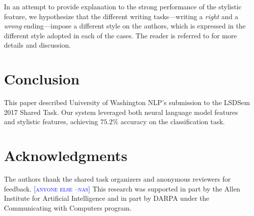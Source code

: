 \documentclass[11pt]{article}
\newcommand{\nascomment}[1]{\textcolor{blue}{[\textsc{#1 --nas}]}}
\begin{document}
In an attempt to provide explanation to the strong performance of the stylistic feature, 
we hypothesize that the different writing tasks---writing a {\it right} and a {\it wrong} ending---impose a different style on the authors, which is expressed in the different style adopted in each of the cases. 
The reader is referred to  for more details and discussion.


\section{Conclusion}
This paper described University of Washington NLP's submission to the LSDSem 2017 Shared Task. 
Our system leveraged both neural language model features and  stylistic features, achieving $75.2\%$ accuracy on the classification task. 

\section*{Acknowledgments}
The authors thank the shared task organizers and anonymous reviewers
for feedback.  \nascomment{anyone else} This research was supported in
part by the Allen Institute for Artificial Intelligence and in part by
DARPA under the Communicating with Computers program.



\end{document}
